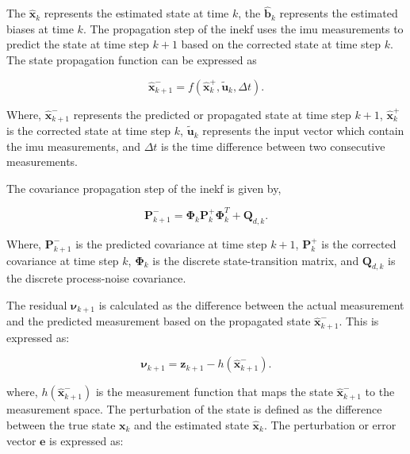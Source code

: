 \documentclass[report.tex]{subfiles}
\begin{document}
The $\hat{\boldsymbol{x}}_{k}$ represents the estimated state at time $k$, the $\hat{\boldsymbol{b}}_{k}$ represents the estimated biases at time $k$. The propagation step of the \gls{inekf} uses the \gls{imu} measurements to predict the state at time step $k+1$ based on the corrected state at time step $k$. The state propagation function can be expressed as

\begin{equation}
    \hat{\boldsymbol{x}}^{-}_{k+1}
    =
    f\left(
        \hat{\boldsymbol{x}}^{+}_{k},
        \tilde{\boldsymbol{u}}_{k},
        \Delta t
    \right).
    \label{eq:inekfStatePropagationBackground}
\end{equation}

Where, $\hat{\boldsymbol{x}}^{-}_{k+1}$ represents the predicted or propagated state at time step $k+1$, $\hat{\boldsymbol{x}}^{+}_{k}$ is the corrected state at time step $k$, $\tilde{\boldsymbol{u}}_{k}$ represents the input vector which contain the \gls{imu} measurements, and $\Delta t$ is the time difference between two consecutive measurements.

The covariance propagation step of the \gls{inekf} is given by,

\begin{equation}
    \boldsymbol{P}^{-}_{k+1}
    =
    \boldsymbol{\Phi}_{k}
    \boldsymbol{P}^{+}_{k}
    \boldsymbol{\Phi}_{k}^{T}
    +
    \boldsymbol{Q}_{d,k}.
    \label{eq:inekfCovariancePropagationBackground}
\end{equation}

Where, $\boldsymbol{P}^{-}_{k+1}$ is the predicted covariance at time step $k+1$, $\boldsymbol{P}^{+}_{k}$ is the corrected covariance at time step $k$, $\boldsymbol{\Phi}_{k}$ is the discrete state-transition matrix, and $\boldsymbol{Q}_{d,k}$ is the discrete process-noise covariance.

The residual $\boldsymbol{\nu}_{k+1}$ is calculated as the difference between the actual measurement and the predicted measurement based on the propagated state $\hat{\boldsymbol{x}}^{-}_{k+1}$. This is expressed as:

\begin{equation}
    \boldsymbol{\nu}_{k+1}
    =
    \boldsymbol{z}_{k+1}
    -
    h\left(
        \hat{\boldsymbol{x}}^{-}_{k+1}
    \right).
    \label{eq:inekfResidualBackground}
\end{equation}

where, $h(\hat{\boldsymbol{x}}^{-}_{k+1})$ is the measurement function that maps the state $\hat{\boldsymbol{x}}^{-}_{k+1}$ to the measurement space. The perturbation of the state is defined as the difference between the true state $\boldsymbol{x}_{k}$ and the estimated state $\hat{\boldsymbol{x}}_{k}$. The perturbation or error vector $\boldsymbol{e}$ is expressed as:
\end{document}
